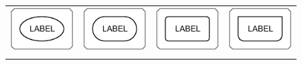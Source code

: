 \begin{figure}[h]
\begin{tabu}{X[c,m]X[c,m]X[c,m]X[c,m]}
    \includegraphics[scale=0.8, valign=m]{images/build/unspecified_subunit.pdf} & \includegraphics[scale=0.8, valign=m]{images/build/simple_chemical_subunit.pdf} & \includegraphics[scale=0.8, valign=m]{images/build/macromolecule_subunit.pdf} & \includegraphics[scale=0.8, valign=m]{images/build/genetic_subunit.pdf}\\[0.2cm]
     &  &  & \\[0.5cm]

\end{tabu}
\end{figure}
